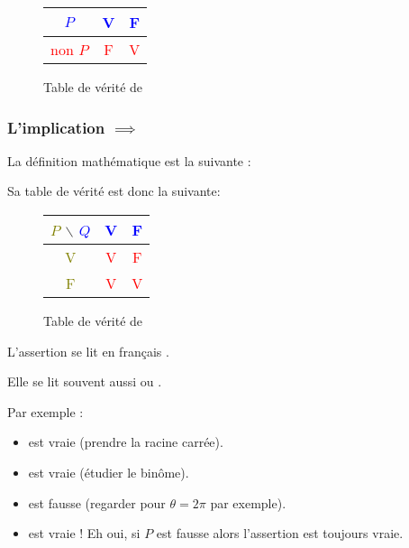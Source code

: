 \documentclass[11pt,class=report,crop=false]{standalone}
\begin{document}
\begin{figure}[H]
\centering
\begin{tabular}{c|c|c}
 \textcolor{blue}{$P$}  &  \textcolor{blue}{V} &  \textcolor{blue}{F} \\ \hline
 \textcolor{red}{non $P$}    & \textcolor{red}{F} & \textcolor{red}{V} \\
\end{tabular}
\caption{Table de vérité de }
\end{figure}


\subsubsection*{L'implication $\implies$}


La définition mathématique est la suivante :


Sa table de vérité est donc la suivante:
\begin{figure}[H]
\centering
\begin{tabular}{c|c|c}
\textcolor{olive}{$P$} $\backslash$ \textcolor{blue}{$Q$}  & \textcolor{blue}{V} & \textcolor{blue}{F} \\ \hline
\textcolor{olive}{V} & \textcolor{red}{V} & \textcolor{red}{F} \\ \hline
\textcolor{olive}{F} & \textcolor{red}{V} & \textcolor{red}{V} \\
\end{tabular}
\caption{Table de vérité de }
\end{figure}
L'assertion  se lit en français .

Elle se lit souvent aussi 
ou .

Par exemple :
\begin{itemize}
  \item {}  est vraie (prendre la racine carrée).
  \item \assertion{$x \in ]-\infty, -4[ \implies x^2+3x-4 > 0$}  est vraie (étudier le binôme).
  \item {}  est fausse (regarder pour $\theta = 2\pi$ par exemple).
  \item {}  est vraie ! Eh oui, si
$P$ est fausse alors l'assertion  est toujours vraie.
\end{itemize}
\end{document}
